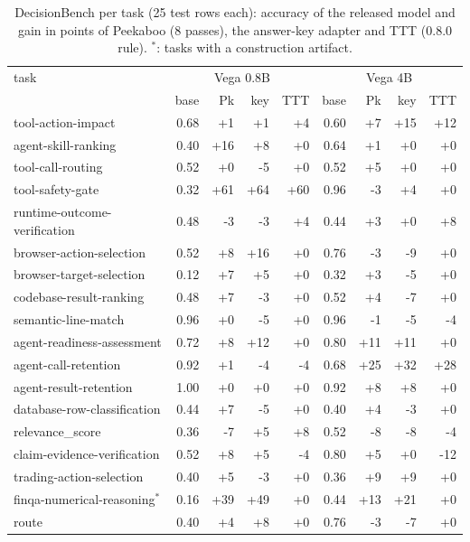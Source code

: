 \begin{table}[tbp]\centering\scriptsize
\caption{DecisionBench per task (25 test rows each): accuracy of the released model and gain in points of Peekaboo (8 passes), the answer-key adapter and TTT (0.8.0 rule). $^*$: tasks with a construction artifact.}
\label{tab:tasks_db}
\setlength{\tabcolsep}{3pt}
\begin{tabular}{lrrrrrrrr}
\toprule
task & \multicolumn{4}{c}{Vega 0.8B} & \multicolumn{4}{c}{Vega 4B} \\
 & base & Pk & key & TTT & base & Pk & key & TTT \\
\midrule
tool-action-impact & 0.68 & +1 & +1 & +4 & 0.60 & +7 & +15 & +12 \\
agent-skill-ranking & 0.40 & +16 & +8 & +0 & 0.64 & +1 & +0 & +0 \\
tool-call-routing & 0.52 & +0 & -5 & +0 & 0.52 & +5 & +0 & +0 \\
tool-safety-gate & 0.32 & +61 & +64 & +60 & 0.96 & -3 & +4 & +0 \\
runtime-outcome-verification & 0.48 & -3 & -3 & +4 & 0.44 & +3 & +0 & +8 \\
browser-action-selection & 0.52 & +8 & +16 & +0 & 0.76 & -3 & -9 & +0 \\
browser-target-selection & 0.12 & +7 & +5 & +0 & 0.32 & +3 & -5 & +0 \\
codebase-result-ranking & 0.48 & +7 & -3 & +0 & 0.52 & +4 & -7 & +0 \\
semantic-line-match & 0.96 & +0 & -5 & +0 & 0.96 & -1 & -5 & -4 \\
agent-readiness-assessment & 0.72 & +8 & +12 & +0 & 0.80 & +11 & +11 & +0 \\
agent-call-retention & 0.92 & +1 & -4 & -4 & 0.68 & +25 & +32 & +28 \\
agent-result-retention & 1.00 & +0 & +0 & +0 & 0.92 & +8 & +8 & +0 \\
database-row-classification & 0.44 & +7 & -5 & +0 & 0.40 & +4 & -3 & +0 \\
relevance\_score & 0.36 & -7 & +5 & +8 & 0.52 & -8 & -8 & -4 \\
claim-evidence-verification & 0.52 & +8 & +5 & -4 & 0.80 & +5 & +0 & -12 \\
trading-action-selection & 0.40 & +5 & -3 & +0 & 0.36 & +9 & +9 & +0 \\
finqa-numerical-reasoning$^*$ & 0.16 & +39 & +49 & +0 & 0.44 & +13 & +21 & +0 \\
route & 0.40 & +4 & +8 & +0 & 0.76 & -3 & -7 & +0 \\

\end{tabular}
\end{table}
